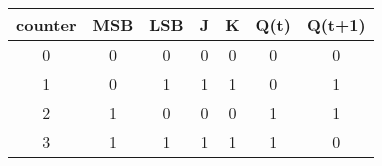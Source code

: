 \begin{tabular}{|c|c|c|c|c|c|c|}
        \hline counter & MSB & LSB & J & K & Q(t) & Q(t+1) \\
        \hline 0 & 0 & 0 & 0 & 0 & 0 & 0 \\
        \hline 1 & 0 & 1 & 1 & 1 & 0 & 1 \\
        \hline 2 & 1 & 0 & 0 & 0 & 1 & 1 \\
        \hline 3 & 1 & 1 & 1 & 1 & 1 & 0 \\
        \hline
        \end{tabular}
